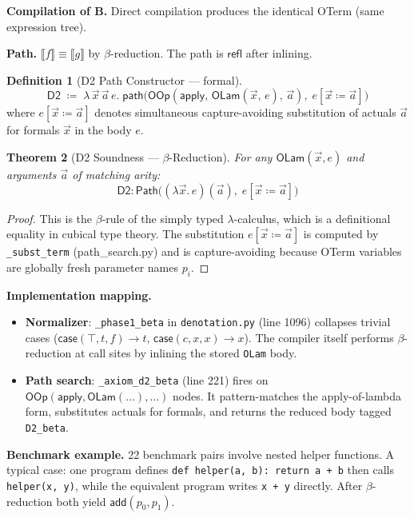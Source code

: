 \documentclass[11pt,a4paper]{report}
\theoremstyle{definition}
\newtheorem{definition}{Definition}[chapter]
\theoremstyle{plain}
\newtheorem{theorem}[definition]{Theorem}
\newcommand{\den}[1]{\llbracket #1 \rrbracket}
\newcommand{\Path}{\mathsf{Path}}
\begin{document}
\textbf{Compilation of B.}
Direct compilation produces the identical OTerm (same expression
tree).

\textbf{Path.}
$\den{f} \equiv \den{g}$ by $\beta$-reduction.  The path is
$\mathsf{refl}$ after inlining.

\begin{definition}[D2 Path Constructor --- formal]
\label{def:d2-path}
\[
  \mathsf{D2} \;\coloneqq\; \lambda\, \vec{x}\, \vec{a}\, e.\;
  \mathsf{path}\!\big(
    \mathsf{OOp}(\mathsf{apply},\,
      \mathsf{OLam}(\vec{x},\, e),\, \vec{a}),\;
    e[\vec{x} \coloneqq \vec{a}]
  \big)
\]
where $e[\vec{x} \coloneqq \vec{a}]$ denotes simultaneous
capture-avoiding substitution of actuals $\vec{a}$ for formals
$\vec{x}$ in the body $e$.
\end{definition}

\begin{theorem}[D2 Soundness --- $\beta$-Reduction]
\label{thm:d2-sound}
For any $\mathsf{OLam}(\vec{x}, e)$ and arguments $\vec{a}$ of
matching arity:
\[
  \mathsf{D2} : \Path\!\big(
    (\lambda \vec{x}.\, e)(\vec{a}),\;
    e[\vec{x} \coloneqq \vec{a}]
  \big)
\]
\end{theorem}

\begin{proof}
This is the $\beta$-rule of the simply typed $\lambda$-calculus,
which is a definitional equality in cubical type theory.  The
substitution $e[\vec{x} \coloneqq \vec{a}]$ is computed by
\texttt{\_subst\_term} (path\_search.py) and is capture-avoiding
because OTerm variables are globally fresh parameter names $p_i$.
\end{proof}

\textbf{Implementation mapping.}
\begin{itemize}
  \item \textbf{Normalizer}: \texttt{\_phase1\_beta} in
    \texttt{denotation.py} (line 1096) collapses trivial cases
    ($\mathsf{case}(\top, t, f) \to t$, $\mathsf{case}(c, x, x) \to x$).
    The compiler itself performs $\beta$-reduction at call sites by
    inlining the stored \texttt{OLam} body.
  \item \textbf{Path search}: \texttt{\_axiom\_d2\_beta}
    (line 221) fires on $\mathsf{OOp}(\mathsf{apply}, \mathsf{OLam}(\ldots), \ldots)$
    nodes.  It pattern-matches the apply-of-lambda form, substitutes
    actuals for formals, and returns the reduced body tagged
    \texttt{D2\_beta}.
\end{itemize}

\textbf{Benchmark example.}
22 benchmark pairs involve nested helper functions.  A typical case:
one program defines \texttt{def helper(a, b): return a + b} then
calls \texttt{helper(x, y)}, while the equivalent program writes
\texttt{x + y} directly.  After $\beta$-reduction both yield
$\mathsf{add}(p_0, p_1)$.
\end{document}

